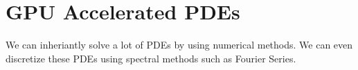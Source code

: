 \documentclass{article}
\begin{document}
\section{GPU Accelerated PDEs}
We can inheriantly solve a lot of PDEs by using numerical methods. We can even discretize these PDEs using spectral methods such as Fourier Series.
\end{document}

